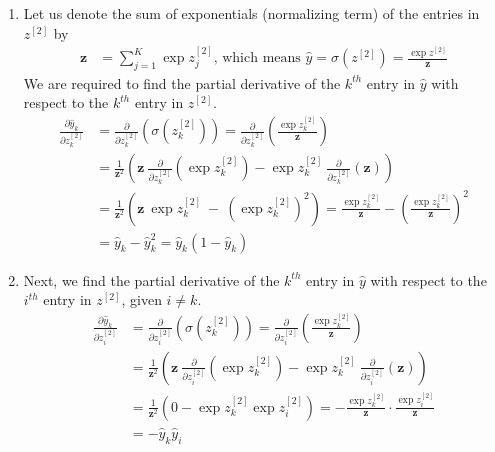 \documentclass[10pt]{article}
\begin{document}
\begin{enumerate}[label=(\alph*)]
        \item Let us denote the sum of exponentials (normalizing term) of the entries in $z^{[2]}$ by
        \begin{align*}
            \mathbf{z} &= \sum_{j=1}^{K} \exp{z^{[2]}_{j}} \text{, which means } \hat{y} = \sigma\left( z^{[2]} \right) = \frac{\exp{z^{[2]}}}{\mathbf{z}}
        \end{align*}
        We are required to find the partial derivative of the $k^{th}$ entry in $\hat{y}$ with respect
        to the $k^{th}$ entry in $z^{[2]}$.
        \begin{align*}
            \frac{\partial{\hat{y}_{k}}}{\partial{z^{[2]}_{k}}} &= \frac{\partial}{\partial{z^{[2]}_{k}}} \left( \sigma\left( z^{[2]}_{k} \right) \right)
            = \frac{\partial}{\partial{z^{[2]}_{k}}} \left( \frac{\exp{z^{[2]}_{k}}}{\mathbf{z}} \right) \\
            &= \frac{1}{\mathbf{z}^{2}} \left( \mathbf{z} \ \frac{\partial}{\partial{z^{[2]}_{k}}} \left( \exp{z^{[2]}_{k}} \right) -
            \exp{z^{[2]}_{k}} \ \frac{\partial}{\partial{z^{[2]}_{k}}} \left( \mathbf{z} \right) \right) \\
            &= \frac{1}{\mathbf{z}^{2}} \left( \mathbf{z} \ \exp{z^{[2]}_{k}} \ - \ \left( \exp{z^{[2]}_{k}} \right)^{2} \right)
            = \frac{\exp{z^{[2]}_{k}}}{\mathbf{z}} - \left( \frac{\exp{z^{[2]}_{k}}}{\mathbf{z}} \right)^{2} \\
            &= \hat{y}_{k} - \hat{y}_{k}^{2} = \hat{y}_{k} \left( 1 - \hat{y}_{k} \right)
        \end{align*}

        \item Next, we find the partial derivative of the $k^{th}$ entry in $\hat{y}$ with respect
        to the $i^{th}$ entry in $z^{[2]}$, given $i \neq k$.
        \begin{align*}
            \frac{\partial{\hat{y}_{k}}}{\partial{z^{[2]}_{i}}} &= \frac{\partial}{\partial{z^{[2]}_{i}}} \left( \sigma\left( z^{[2]}_{k} \right) \right)
            = \frac{\partial}{\partial{z^{[2]}_{i}}} \left( \frac{\exp{z^{[2]}_{k}}}{\mathbf{z}} \right) \\
            &= \frac{1}{\mathbf{z}^{2}} \left( \mathbf{z} \ \frac{\partial}{\partial{z^{[2]}_{i}}} \left( \exp{z^{[2]}_{k}} \right) -
            \exp{z^{[2]}_{k}} \ \frac{\partial}{\partial{z^{[2]}_{i}}} \left( \mathbf{z} \right) \right) \\
            &= \frac{1}{\mathbf{z}^{2}} \left( 0 - \exp{z^{[2]}_{k}} \exp{z^{[2]}_{i}} \right)
            = - \frac{\exp{z^{[2]}_{k}}}{\mathbf{z}} \cdot \frac{\exp{z^{[2]}_{i}}}{\mathbf{z}} \\
            &= - \hat{y}_{k} \hat{y}_{i}
        \end{align*}


\end{enumerate}
\end{document}
